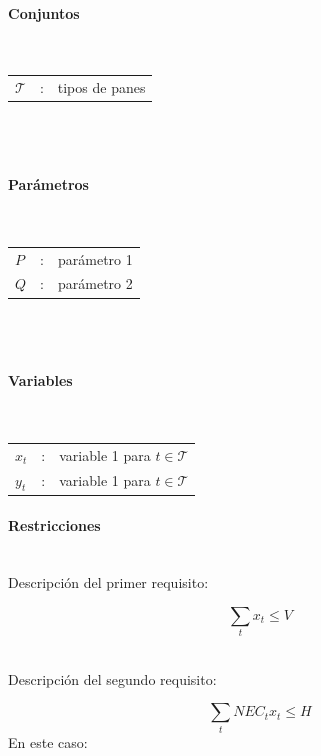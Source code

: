 \paragraph{Conjuntos}\mbox{}\\

\begin{tabular}{l c l}
    $\mathcal{T}$  & : & tipos de panes \\
\end{tabular}
\\
\\

\paragraph{Parámetros}\mbox{}\\

\begin{tabular}{l c l}
    $P$  & : & parámetro 1 \\
    $Q$  & : & parámetro 2 \\
\end{tabular}
\\
\\

\paragraph{Variables}\mbox{}\\

\begin{tabular}{l c l}
    $x_t$  & : & variable 1 para $t \in \mathcal{T}$\\
    $y_t$  & : & variable 1 para $t \in \mathcal{T}$\\
\end{tabular}

\paragraph{Restricciones}\mbox{}\\

Descripción del primer requisito:

\begin{equation}
    \sum_t{x_t} \leq V
\end{equation}

\
\\
Descripción del segundo requisito:

\begin{equation}
    \sum_t{NEC_tx_t} \leq H
\end{equation}
En este caso: 
\\

